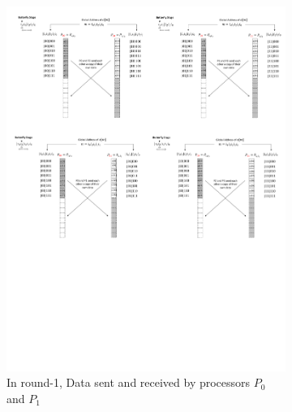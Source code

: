 \documentclass{iacrtrans}
\theoremstyle{plain}
\begin{document}
\begin{figure}[!tb]
\begin{subfigure}[b]{0.47\textwidth}
\includegraphics[width=\textwidth]{./fig/DataSwapWithoutPerm3.pdf}
\caption{In round-1, Data sent and received by processors $P_0$ and $P_1$}\label{fig:dataswap_without_perm3}
\end{subfigure}
\hspace{1em}
\begin{subfigure}[b]{.47\textwidth}\centering

\end{subfigure}
\end{figure}
\end{document}
